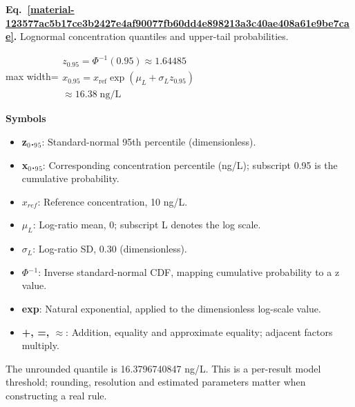 \documentclass[11pt,a4paper]{article}
\begin{document}
\par\medskip
\begin{samepage}
\label{material-123577ac5b17ce3b2427e4af90077fb60dd4e898213a3c40ae408a61e9be7cae}
\noindent\textbf{Eq.~\ref*{material-123577ac5b17ce3b2427e4af90077fb60dd4e898213a3c40ae408a61e9be7cae}.} Lognormal concentration quantiles and upper-tail probabilities.\par\nopagebreak
\begin{center}\begin{adjustbox}{max width=\linewidth}$\displaystyle \begin{gathered}z_{0.95}=\Phi^{-1}(0.95)\approx1.64485\\x_{0.95}=x_{\mathrm{ref}}\exp(\mu_L+\sigma_L z_{0.95})\\\approx16.38\;\mathrm{ng/L}\end{gathered}$\end{adjustbox}\end{center}

\par\noindent\textbf{Symbols}

\begin{itemize}\setlength{\itemsep}{1pt}\setlength{\parsep}{0pt}
\item \textbf{z\ensuremath{{}_0}.\ensuremath{{}_9}\ensuremath{{}_5}}: Standard-normal 95th percentile (dimensionless).
\item \textbf{x\ensuremath{{}_0}.\ensuremath{{}_9}\ensuremath{{}_5}}: Corresponding concentration percentile (ng/L); subscript 0.95 is the cumulative probability.
\item \textbf{\(x_{ref}\)}: Reference concentration, 10 ng/L.
\item \textbf{\(μ_L\)}: Log-ratio mean, 0; subscript L denotes the log scale.
\item \textbf{\(σ_L\)}: Log-ratio SD, 0.30 (dimensionless).
\item \textbf{\ensuremath{\Phi}\ensuremath{{}^-}\ensuremath{{}^1}}: Inverse standard-normal CDF, mapping cumulative probability to a z value.
\item \textbf{exp}: Natural exponential, applied to the dimensionless log-scale value.
\item \textbf{+, =, \ensuremath{\approx}}: Addition, equality and approximate equality; adjacent factors multiply.
\end{itemize}

The unrounded quantile is 16.3796740847 ng/L. This is a per-result model threshold; rounding, resolution and estimated parameters matter when constructing a real rule.

\end{samepage}
\medskip
\end{document}
